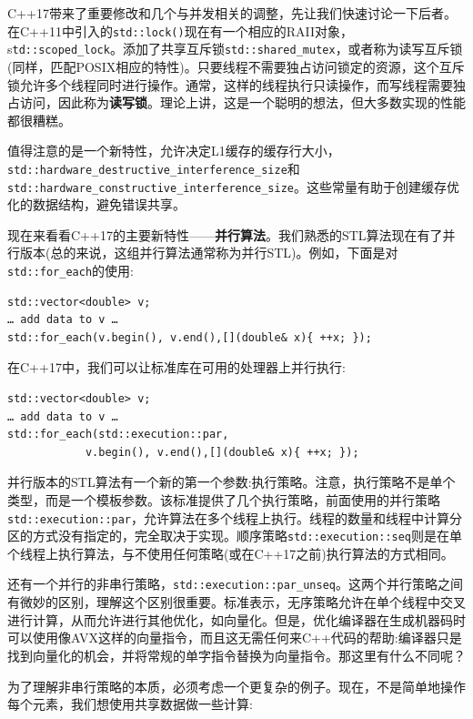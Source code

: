 C++17带来了重要修改和几个与并发相关的调整，先让我们快速讨论一下后者。在C++11中引入的\texttt{std::lock()}现在有一个相应的RAII对象，s\texttt{td::scoped\_lock}。添加了共享互斥锁\texttt{std::shared\_mutex}，或者称为读写互斥锁(同样，匹配POSIX相应的特性)。只要线程不需要独占访问锁定的资源，这个互斥锁允许多个线程同时进行操作。通常，这样的线程执行只读操作，而写线程需要独占访问，因此称为\textbf{读写锁}。理论上讲，这是一个聪明的想法，但大多数实现的性能都很糟糕。

值得注意的是一个新特性，允许决定L1缓存的缓存行大小，\texttt{std::hardware\_destructive\_\linebreak interference\_size}和\texttt{std::hardware\_constructive\_interference\_size}。这些常量有助于创建缓存优化的数据结构，避免错误共享。

现在来看看C++17的主要新特性——\textbf{并行算法}。我们熟悉的STL算法现在有了并行版本(总的来说，这组并行算法通常称为并行STL)。例如，下面是对\texttt{std::for\_each}的使用:

\begin{lstlisting}[style=styleCXX]
std::vector<double> v;
… add data to v … 
std::for_each(v.begin(), v.end(),[](double& x){ ++x; });
\end{lstlisting}

在C++17中，我们可以让标准库在可用的处理器上并行执行:

\begin{lstlisting}[style=styleCXX]
std::vector<double> v;
… add data to v … 
std::for_each(std::execution::par,
			v.begin(), v.end(),[](double& x){ ++x; });
\end{lstlisting}

并行版本的STL算法有一个新的第一个参数:执行策略。注意，执行策略不是单个类型，而是一个模板参数。该标准提供了几个执行策略，前面使用的并行策略\texttt{std::execution::par}，允许算法在多个线程上执行。线程的数量和线程中计算分区的方式没有指定的，完全取决于实现。顺序策略\texttt{std::execution::seq}则是在单个线程上执行算法，与不使用任何策略(或在C++17之前)执行算法的方式相同。

还有一个并行的非串行策略，\texttt{std::execution::par\_unseq}。这两个并行策略之间有微妙的区别，理解这个区别很重要。标准表示，无序策略允许在单个线程中交叉进行计算，从而允许进行其他优化，如向量化。但是，优化编译器在生成机器码时可以使用像AVX这样的向量指令，而且这无需任何来C++代码的帮助:编译器只是找到向量化的机会，并将常规的单字指令替换为向量指令。那这里有什么不同呢？

为了理解非串行策略的本质，必须考虑一个更复杂的例子。现在，不是简单地操作每个元素，我们想使用共享数据做一些计算:

